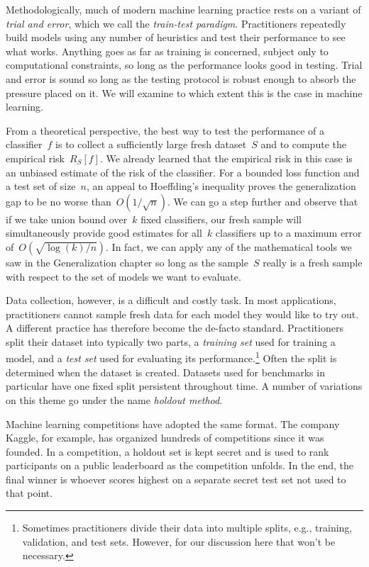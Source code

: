 \documentclass{tufte-book}
\begin{document}
Methodologically, much of modern machine learning practice rests on a
variant of \emph{trial and error}, which we call the \emph{train-test
paradigm}. Practitioners repeatedly build models using any number of
heuristics and test their performance to see what works. Anything goes
as far as training is concerned, subject only to computational
constraints, so long as the performance looks good in testing. Trial and
error is sound so long as the testing protocol is robust enough to
absorb the pressure placed on it. We will examine to which extent this
is the case in machine learning.

From a theoretical perspective, the best way to test the performance of
a classifier~\(f\) is to collect a sufficiently large fresh
dataset~\(S\) and to compute the empirical risk~\(R_S[f]\). We already
learned that the empirical risk in this case is an unbiased estimate of
the risk of the classifier. For a bounded loss function and a test set
of size~\(n\), an appeal to Hoeffding's inequality proves the
generalization gap to be no worse than~\(O(1/\sqrt{n})\). We can go a
step further and observe that if we take union bound over~\(k\) fixed
classifiers, our fresh sample will simultaneously provide good estimates
for all~\(k\) classifiers up to a maximum error
of~\(O(\sqrt{\log(k)/n})\). In fact, we can apply any of the
mathematical tools we saw in the Generalization chapter so long as the
sample~\(S\) really is a fresh sample with respect to the set of models
we want to evaluate.

Data collection, however, is a difficult and costly task. In most
applications, practitioners cannot sample fresh data for each model they
would like to try out. A different practice has therefore become the
de-facto standard. Practitioners split their dataset into typically two
parts, a \emph{training set} used for training a model, and a \emph{test
set} used for evaluating its performance.\footnote{Sometimes
  practitioners divide their data into multiple splits, e.g., training,
  validation, and test sets. However, for our discussion here that won't
  be necessary.} Often the split is determined when the dataset is
created. Datasets used for benchmarks in particular have one fixed split
persistent throughout time. A number of variations on this theme go
under the name \emph{holdout method}.

Machine learning competitions have adopted the same format. The company
Kaggle, for example, has organized hundreds of competitions since it was
founded. In a competition, a holdout set is kept secret and is used to
rank participants on a public leaderboard as the competition unfolds. In
the end, the final winner is whoever scores highest on a separate secret
test set not used to that point.
\end{document}
